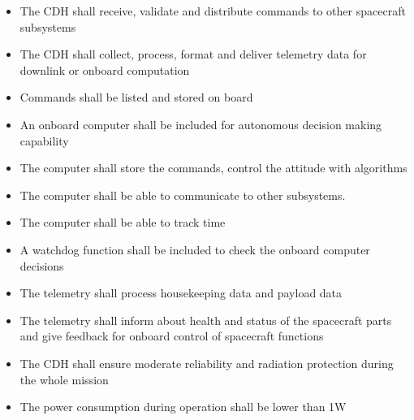 \begin{itemize}
	\item The CDH shall receive, validate and distribute commands to other spacecraft subsystems
	\item The CDH shall collect, process, format and deliver telemetry data for downlink or onboard computation
	\item Commands shall be listed and stored on board
	\item An onboard computer shall be included for autonomous decision making capability
	\item The computer shall store the commands, control the attitude with algorithms
	\item The computer shall be able to communicate to other subsystems.
	\item The computer shall be able to track time
	\item A watchdog function shall be included to check the onboard computer decisions
	\item The telemetry shall process housekeeping data and payload data
	\item The telemetry shall inform about health and status of the spacecraft parts and give feedback for onboard control of spacecraft functions
	\item The CDH shall ensure moderate reliability and radiation protection during the whole mission
	\item The power consumption during operation shall be lower than 1W
\end{itemize}

